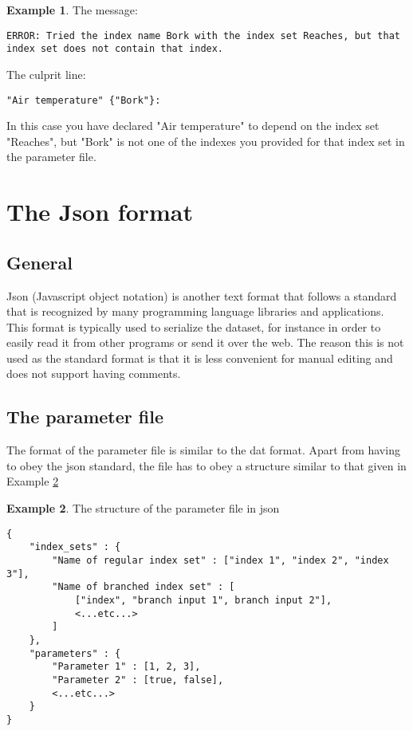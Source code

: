 \documentclass[11pt]{article}
\theoremstyle{definition}
\newtheorem{myexample}{Example}
\newenvironment{example}%
  {\begin{lrbox}{\examplebox}%
   \begin{minipage}{\dimexpr\linewidth-2\fboxsep}
   \begin{myexample}}%
  {\end{myexample}%
   \end{minipage}%
   \end{lrbox}%
   \begin{trivlist}
     \item[]\colorbox{silver}{\usebox\examplebox}
   \end{trivlist}}
\begin{document}
\begin{example}
The message:
\begin{lstlisting}
ERROR: Tried the index name Bork with the index set Reaches, but that index set does not contain that index.
\end{lstlisting}
The culprit line:
\begin{lstlisting}[mathescape]
"Air temperature" {"Bork"}:
\end{lstlisting}
In this case you have declared "Air temperature" to depend on the index set "Reaches", but "Bork" is not one of the indexes you provided for that index set in the parameter file.
\end{example}

\section{The Json format}

\subsection{General}

Json (Javascript object notation)  is another text format that follows a standard that is recognized by many programming language libraries and applications. This format is typically used to serialize the dataset, for instance in order to easily read it from other programs or send it over the web. The reason this is not used as the standard format is that it is less convenient for manual editing and does not support having comments.

\subsection{The parameter file}
The format of the parameter file is similar to the dat format. Apart from having to obey the json standard, the file has to obey a structure similar to that given in Example \ref{ex:jsonpar}

\begin{example}\label{ex:jsonpar}
The structure of the parameter file in json
\begin{lstlisting}
{
	"index_sets" : {
		"Name of regular index set" : ["index 1", "index 2", "index 3"],
		"Name of branched index set" : [
			["index", "branch input 1", branch input 2"],
			<...etc...>
		]
	},
	"parameters" : {
		"Parameter 1" : [1, 2, 3],
		"Parameter 2" : [true, false],
		<...etc...>
	}
}
\end{lstlisting}
\end{example}
\end{document}
